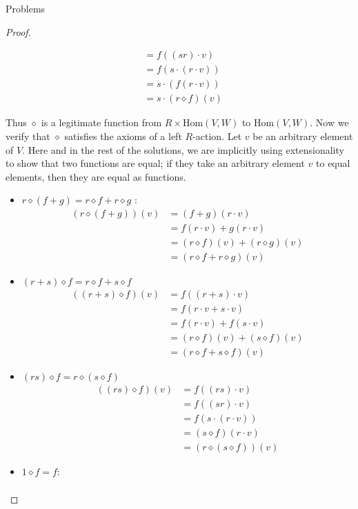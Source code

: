 \documentclass[12pt]{article}
\theoremstyle{definition}
\begin{document}
\begin{section}{Problems}
\begin{proof}
\begin{itemize}
\begin{align*}
					&= f( (sr) \cdot v)\\
					&= f( s \cdot (r \cdot v))\\
					&= s \cdot (f (r \cdot v))\\
					&= s \cdot (r \diamond f)(v)
				\end{align*}
		\end{itemize}
		Thus $\diamond$ is a legitimate function from $R \times \text{Hom}(V,W)$ to $\text{Hom}(V,W)$. Now we verify that $\diamond$ satisfies the axioms of a left $R$-action. Let $v$ be an arbitrary element of $V$. Here and in the rest of the solutions, we are implicitly using extensionality to show that two functions are equal; if they take an arbitrary element $v$ to equal elements, then they are equal as functions.
		\begin{itemize}
			\item $r \diamond (f + g) = r \diamond f + r \diamond g$ :     
				\begin{align*}
					(r \diamond (f + g))(v) &= (f+ g)(r \cdot v)\\
					&= f(r \cdot v) + g(r \cdot v)\\
					&= (r \diamond f)(v) + (r \diamond g)(v)\\
					&= (r \diamond f + r \diamond g)(v)
				\end{align*}
			\item $(r + s)\diamond f = r \diamond f + s \diamond f$
				\begin{align*}
					((r+ s)\diamond f)(v) &= f(( r + s) \cdot v)\\
					&= f( r \cdot v + s \cdot v) \\
					&= f( r \cdot v) + f( s \cdot v)\\
					&= (r \diamond f)(v) + (s \diamond f)(v)\\
					&= (r \diamond f + s \diamond f)(v)
				\end{align*}
			\item $(rs) \diamond f = r \diamond (s \diamond f)$ 
				\begin{align*}
					((rs) \diamond f )(v) &= f( (rs) \cdot v)\\
					&= f( (sr) \cdot v)\\
					&= f ( s \cdot (r \cdot v))\\
					&= (s \diamond f)(r \cdot v)\\
					&= (r \diamond (s \diamond f))(v)
				\end{align*}
			\item $1\diamond f = f$:
				\begin{align*}

\end{align*}
\end{itemize}
\end{proof}
\end{section}
\end{document}
